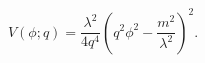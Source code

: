 \begin{equation}
\label{PD}
V(\phi;q) = \frac{\lambda^2}{4q^4}\left(q^2\phi^2 -
\frac{m^2}{\lambda^2}\right)^2.
\end{equation}

